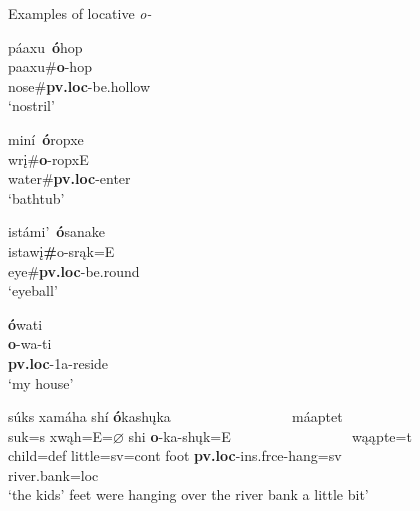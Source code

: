 \newpage
\begin{exe}

\item\label{locativeexamples} Examples of locative \textit{o-}

	\begin{xlist}
	
	\item \glll páaxu~\textbf{ó}hop\\
	paaxu\#\textbf{o}-hop\\
	\textnormal{nose}\#\textbf{pv.loc}-\textnormal{be.hollow}\\
	\glt `nostril' \citep[77]{hollow1970}
	
	\item \glll miní~\textbf{ó}ropxe\\
	wrį\#\textbf{o}-ropxE\\
	\textnormal{water}\#\textbf{pv.loc}-\textnormal{enter}\\
	\glt 	`bathtub' \citep[189]{hollow1970}
	
	\item \glll istámi'~\textbf{ó}sanake\\
	istawį\textbf{\#}o-srąk=E\\
	\textnormal{eye}\#\textbf{pv.loc}-\textnormal{be.round}\\
	\glt `eyeball' \citep[216]{hollow1970}
	
	\item \glll \textbf{ó}wati\\
	\textbf{o}-wa-ti\\
	\textbf{pv.loc}-1a-\textnormal{reside}\\
	\glt `my house' \citet[251]{hollow1970}
		
	\item \glll súks xamáha shí \textbf{ó}kashųka ~ ~ ~ ~ ~ ~ ~ ~ ~ ~  máaptet\\
	suk=s xwąh=E=$\varnothing$ shi \textbf{o}-ka-shųk=E ~ ~ ~ ~ ~ ~ ~ ~ ~ ~  wąąpte=t\\
	\textnormal{child}=def \textnormal{little}=sv=cont \textnormal{foot} \textbf{pv.loc}-ins.frce-\textnormal{hang}=sv ~ ~ ~ ~ ~ ~ ~ ~ ~ ~ \textnormal{river.bank}=loc\\
	\glt `the kids' feet were hanging over the river bank a little bit' \citep[181]{hollow1970}
	

\end{xlist}
\end{exe}
